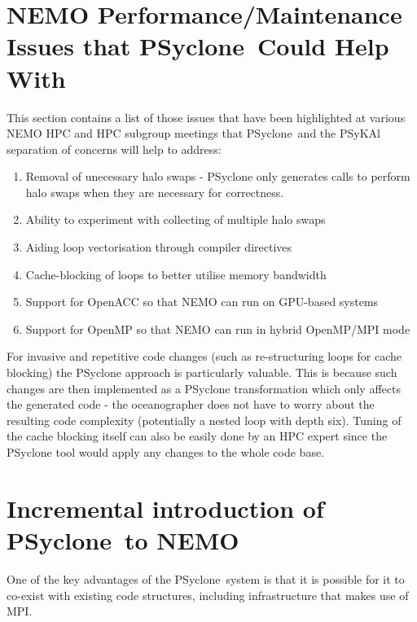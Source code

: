 \documentclass{article}
\newcommand{\psyclone}{{PS}yclone}
\begin{document}
\section{NEMO Performance/Maintenance Issues that \psyclone\ Could Help With}

This section contains a list of those issues that have been
highlighted at various NEMO HPC and HPC subgroup meetings that
\psyclone\ and the PSyKAl separation of concerns will help to address:

\begin{enumerate}

\item Removal of unecessary halo swaps - PSyclone only generates calls to
  perform halo swaps when they are necessary for correctness.

\item Ability to experiment with collecting of multiple halo swaps
  
\item Aiding loop vectorisation through compiler directives

\item Cache-blocking of loops to better utilise memory bandwidth

\item Support for OpenACC so that NEMO can run on GPU-based systems

\item Support for OpenMP so that NEMO can run in hybrid OpenMP/MPI mode
  
\end{enumerate}

For invasive and repetitive code changes (such as re-structuring loops
for cache blocking) the PSyclone approach is particularly
valuable. This is because such changes are then implemented as a
PSyclone transformation which only affects the generated code - the
oceanographer does not have to worry about the resulting code
complexity (potentially a nested loop with depth six). Tuning of the
cache blocking itself can also be easily done by an HPC expert since
the PSyclone tool would apply any changes to the whole code base.

\section{Incremental introduction of \psyclone\ to NEMO}

One of the key advantages of the \psyclone\ system is that it is
possible for it to co-exist with existing code structures, including
infrastructure that makes use of MPI.
\end{document}
